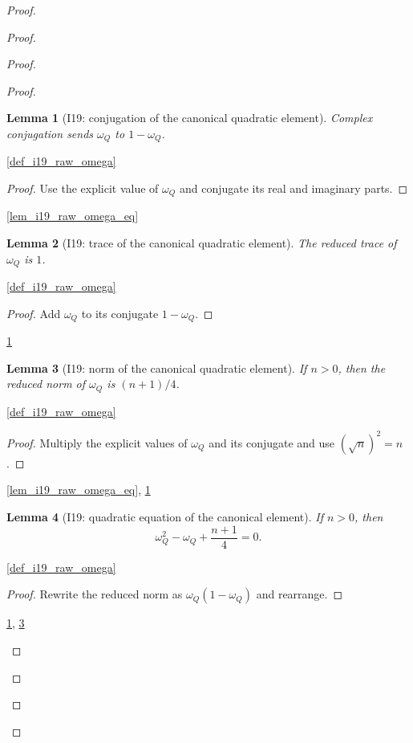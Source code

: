\documentclass[11pt,a4paper]{article}
\numberwithin{equation}{section}
\theoremstyle{plain}\newtheorem{theorem}{Theorem}[section]\newaliascnt{proposition}{theorem}\newtheorem{proposition}[proposition]{Proposition}\aliascntresetthe{proposition}\newaliascnt{lemma}{theorem}\newtheorem{lemma}[lemma]{Lemma}\aliascntresetthe{lemma}
\theoremstyle{definition}\newaliascnt{definition}{theorem}\newtheorem{definition}[definition]{Definition}\aliascntresetthe{definition}\newaliascnt{notation}{theorem}\newtheorem{notation}[notation]{Notation}\aliascntresetthe{notation}
\providecommand{\lean}[1]{}\providecommand{\leanok}{}
\begin{document}
\begin{proof}
\begin{proof}
\begin{proof}
\begin{proof}
\begin{lemma}[I19: conjugation of the canonical quadratic element]\label{lem_i19_raw_omega_star}\lean{SptCM.Repair.star_rawOmega}\leanok
Complex conjugation sends $\omega_Q$ to $1-\omega_Q$.
\end{lemma}
\begin{uses-statement}\ref{def_i19_raw_omega}\end{uses-statement}
\begin{proof}
Use the explicit value of $\omega_Q$ and conjugate its real and imaginary
parts.
\end{proof}
\begin{uses-proof}\ref{lem_i19_raw_omega_eq}\end{uses-proof}

\begin{lemma}[I19: trace of the canonical quadratic element]\label{lem_i19_raw_omega_trace}\lean{SptCM.Repair.reducedTrace_rawOmega}\leanok
The reduced trace of $\omega_Q$ is $1$.
\end{lemma}
\begin{uses-statement}\ref{def_i19_raw_omega}\end{uses-statement}
\begin{proof}
Add $\omega_Q$ to its conjugate $1-\omega_Q$.
\end{proof}
\begin{uses-proof}\ref{lem_i19_raw_omega_star}\end{uses-proof}

\begin{lemma}[I19: norm of the canonical quadratic element]\label{lem_i19_raw_omega_norm}\lean{SptCM.Repair.reducedNorm_rawOmega}\leanok
If $n>0$, then the reduced norm of $\omega_Q$ is $(n+1)/4$.
\end{lemma}
\begin{uses-statement}\ref{def_i19_raw_omega}\end{uses-statement}
\begin{proof}
Multiply the explicit values of $\omega_Q$ and its conjugate and use
$(\sqrt n)^2=n$.
\end{proof}
\begin{uses-proof}\ref{lem_i19_raw_omega_eq}, \ref{lem_i19_raw_omega_star}\end{uses-proof}

\begin{lemma}[I19: quadratic equation of the canonical element]\label{lem_i19_raw_omega_quadratic}\lean{SptCM.Repair.rawOmega_quadratic_relation}\leanok
If $n>0$, then
\[
  \omega_Q^2-\omega_Q+\frac{n+1}{4}=0.
\]
\end{lemma}
\begin{uses-statement}\ref{def_i19_raw_omega}\end{uses-statement}
\begin{proof}
Rewrite the reduced norm as $\omega_Q(1-\omega_Q)$ and rearrange.
\end{proof}
\begin{uses-proof}\ref{lem_i19_raw_omega_star}, \ref{lem_i19_raw_omega_norm}\end{uses-proof}


\end{proof}
\end{proof}
\end{proof}
\end{proof}
\end{document}

